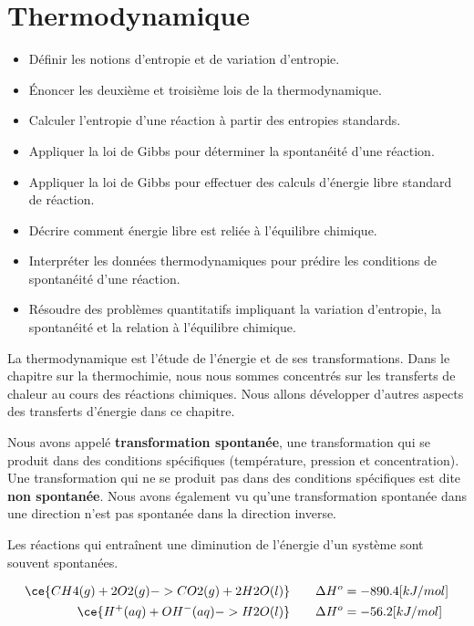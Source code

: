 \documentclass[
  11pt,
  a4paper,
  openany]{book}
\providecommand{\tightlist}{%
  \setlength{\itemsep}{0pt}\setlength{\parskip}{0pt}}
\begin{document}
\chapter{Thermodynamique}\label{thermodynamique}

\begin{objectives}

\begin{itemize}
\tightlist
\item
  Définir les notions d'entropie et de variation d'entropie.
\item
  Énoncer les deuxième et troisième lois de la thermodynamique.
\item
  Calculer l'entropie d'une réaction à partir des entropies standards.
\item
  Appliquer la loi de Gibbs pour déterminer la spontanéité d'une réaction.
\item
  Appliquer la loi de Gibbs pour effectuer des calculs d'énergie libre standard de réaction.
\item
  Décrire comment énergie libre est reliée à l'équilibre chimique.
\item
  Interpréter les données thermodynamiques pour prédire les conditions de spontanéité d'une réaction.
\item
  Résoudre des problèmes quantitatifs impliquant la variation d'entropie, la spontanéité et la relation à l'équilibre chimique.
\end{itemize}

\end{objectives}

La thermodynamique est l'étude de l'énergie et de ses transformations. Dans le chapitre sur la thermochimie, nous nous sommes concentrés sur les transferts de chaleur au cours des réactions chimiques. Nous allons développer d'autres aspects des transferts d'énergie dans ce chapitre.

Nous avons appelé \textbf{transformation spontanée}, une transformation qui se produit dans des conditions spécifiques (température, pression et concentration). Une transformation qui ne se produit pas dans des conditions spécifiques est dite \textbf{non spontanée}. Nous avons également vu qu'une transformation spontanée dans une direction n'est pas spontanée dans la direction inverse.

Les réactions qui entraînent une diminution de l'énergie d'un système sont souvent spontanées.

\[
\begin{split}
    \ce{CH4(g) + 2O2(g) -> CO2(g) + 2H2O(l)} &\qquad \Delta H^{o} = -890.4 [kJ/mol] \\
    \ce{H^+(aq) + OH^-(aq) -> H2O(l)} &\qquad \Delta H^{o} = -56.2 [kJ/mol]
\end{split}
\]
\end{document}
